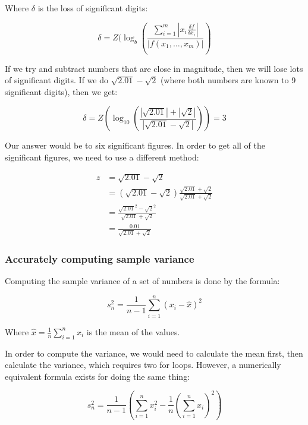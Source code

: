 Where $\delta$ is the loss of significant digits:

\[
  \delta = Z(\log_b(
    \frac{
      \sum^m_{i=1}|x_i\frac{\delta f}{\delta x_i}|
    }{
      |f(x_1, \dots, x_m)|
    }
  )
\]

If we try and subtract numbers that are close in magnitude, then we will lose
lots of significant digits. If we do $\sqrt{2.01} - \sqrt{2}$ (where both
numbers are known to 9 significant digits), then we get:

\[
  \delta = Z(\log_{10}(
    \frac{
      |\sqrt{2.01}| + |\sqrt{2}|
    }{
      |\sqrt{2.01} - \sqrt{2}|
    })) = 3
\]

Our answer would be to six significant figures. In order to get all of the
significant figures, we need to use a different method:

\[
  \begin{split}
    z &= \sqrt{2.01} - \sqrt{2}\\
      &= (\sqrt{2.01} - \sqrt{2})\frac{\sqrt{2.01}
         + \sqrt{2}}{\sqrt{2.01} + \sqrt{2}}\\
      &= \frac{\sqrt{2.01}^2 - \sqrt{2}^2}{\sqrt{2.01} + \sqrt{2}}\\
      &= \frac{0.01}{\sqrt{2.01} + \sqrt{2}}
  \end{split}
\]


\subsubsection{Accurately computing sample variance}

Computing the sample variance of a set of numbers is done by the formula:

\[
  s^2_n = \frac{1}{n - 1}\sum^n_{i=1}(x_i - \hat{x})^2
\]

Where $\hat{x} = \frac{1}{n}\sum^n_{i=1}x_i$ is the mean of the values.

In order to compute the variance, we would need to calculate the mean first,
then calculate the variance, which requires two for loops. However, a
numerically equivalent formula exists for doing the same thing:

\[
  s^2_n = \frac{1}{n-1}(\sum^n_{i=1}x_i^2 - \frac{1}{n}(\sum^n_{i=1}x_i)^2)
\]

